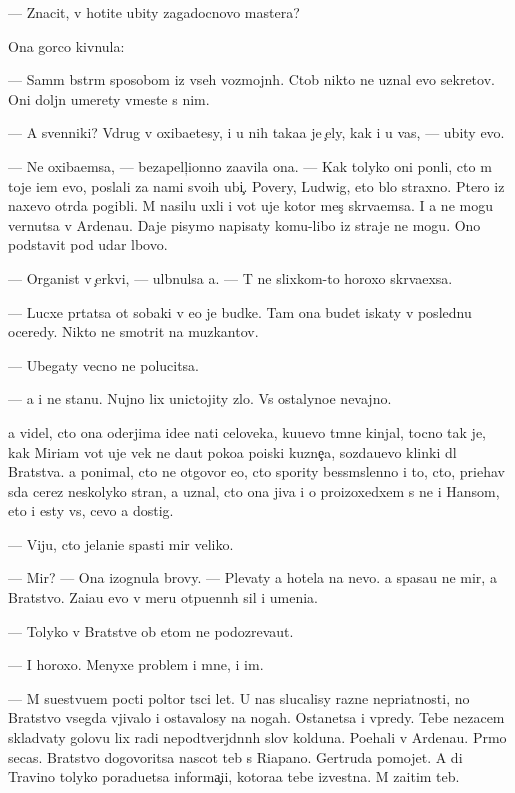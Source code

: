 \documentclass[10pt]{book}
\begin{document}
— Znacit, v{\yi} hotite ubity zagadocnovo mastera?

Ona gor{\ia}co kivnula:

— Sam{\yi}m b{\yi}str{\yi}m sposobom iz vseh vozmojn{\yi}h. Ctob{\yi} nikto ne uznal {\y}evo sekretov. Oni doljn{\yi} umerety vmeste s nim.

— A sv{\ia}{\x}enniki? Vdrug v{\yi} oxiba{\y}etesy, i u nih taka{\y}a je {\c}ely, kak i u vas, — ubity {\y}evo.

— Ne oxiba{\y}emsa, — bezapell{\ia}{\c}ionno za{\y}avila ona. — Kak tolyko oni pon{\ia}li, cto m{\yi} toje i{\x}em {\y}evo, poslali za nami svo{\y}ih ubi{\y}{\c}. Povery, Ludwig, eto b{\yi}lo straxno. P{\ia}tero iz naxevo otr{\ia}da pogibli. M{\yi} nasilu uxli i vot uje kotor{\yi}{\y} mes{\ia}{\c} skr{\yi}va{\y}emsa. I {\y}a ne mogu vernutsa v Ardenau. Daje pisymo napisaty komu-libo iz straje{\y} ne mogu. Ono podstavit pod udar l{\io}bovo.

— Organist v {\c}erkvi, — ul{\yi}bnulsa {\y}a. — T{\yi} ne slixkom-to horoxo skr{\yi}va{\y}exsa.

— Lucxe pr{\ia}tatsa ot sobaki v {\y}e{\y}o je budke. Tam ona budet iskaty v posledn{\io}{\y}u oceredy. Nikto ne smotrit na muz{\yi}kantov.

— Ubegaty vecno ne polucitsa.

— {\Y}a i ne stanu. Nujno lix unictojity zlo. Vs{\e} ostalyno{\y}e ne\-vaj\-no.

{\Y}a videl, cto ona oderjima ide{\y}e{\y} na{\y}ti celoveka, ku{\y}u{\x}evo t{\e}mn{\yi}{\y}e kinjal{\yi}, tocno tak je, kak Mi\-ri\-am vot uje vek ne da{\y}ut poko{\y}a poiski kuzne{\c}a, sozda{\y}u{\x}evo klinki dl{\ia} Bratstva. {\Y}a ponimal, cto ne otgovor{\io} {\y}e{\y}o, cto spority bessm{\yi}slenno i to, cto, pri{\y}ehav s{\io}da cerez neskolyko stran, {\y}a uznal, cto ona jiva i o proizoxedxem s ne{\y} i Hansom, eto i {\y}esty vs{\e}, cevo {\y}a dostig.

— Viju, cto jelani{\y}e spasti mir veliko.

— Mir? — Ona izognula brovy. — Plevaty {\y}a hotela na nevo. {\Y}a spasa{\y}u ne mir, a Bratstvo. Za{\x}i{\x}a{\y}u {\y}evo v meru otpu{\x}enn{\yi}h sil i umeni{\y}a.

— Tolyko v Bratstve ob etom ne podozreva{\y}ut.

— I horoxo. Menyxe problem i mne, i im.

— M{\yi} su{\x}estvu{\y}em pocti poltor{\yi} t{\yi}s{\ia}ci let. U nas slucalisy razn{\yi}{\y}e nepri\-{\y}at\-nosti, no Bratstvo vsegda v{\yi}jivalo i ostavalosy na nogah. Ostanetsa i vpredy. Tebe nezacem sklad{\yi}vaty golovu lix radi nepodtverjd{\e}nn{\yi}h slov kolduna. Po{\y}ehali v Ardenau. Pr{\ia}mo se{\y}cas. Bratstvo dogovoritsa nascot teb{\ia} s Riapano. Gertruda pomojet. A di Travino tolyko poradu{\y}etsa informa{\c}i{\y}i, kotora{\y}a tebe izvestna. M{\yi} za{\x}itim teb{\ia}.
\end{document}
